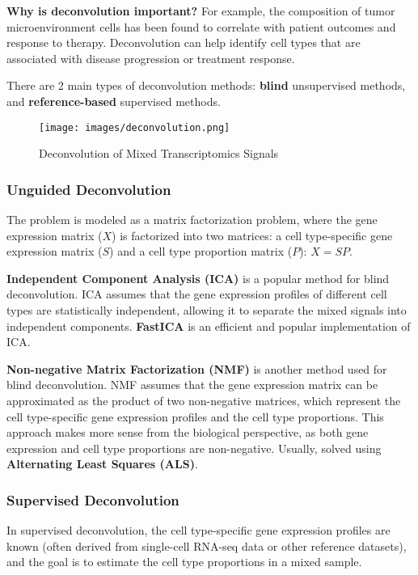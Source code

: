\documentclass[a4paper]{article}
\begin{document}
\textbf{Why is deconvolution important?} For example, the composition 
of tumor microenvironment cells has been found to correlate with patient
outcomes and response to therapy. Deconvolution can help identify cell types
that are associated with disease progression or treatment response.

There are 2 main types of deconvolution methods: \textbf{blind} unsupervised
methods, and \textbf{reference-based} supervised methods. 

\begin{figure}
  \centering
  \texttt{[image: images/deconvolution.png]}
  \caption{Deconvolution of Mixed Transcriptomics Signals}
\end{figure}

\subsubsection*{Unguided Deconvolution}

The problem is modeled as a matrix factorization problem, where the gene expression
matrix ($X$) is factorized into two matrices: a cell type-specific gene expression
matrix ($S$) and a cell type proportion matrix ($P$): $X = SP$.

\textbf{Independent Component Analysis (ICA)} is a popular method for blind
deconvolution. ICA assumes that the gene expression profiles of different cell types
are statistically independent, allowing it to separate the mixed signals into
independent components. \textbf{FastICA} is an efficient and popular
implementation of ICA.

\textbf{Non-negative Matrix Factorization (NMF)} is another method used for
blind deconvolution. NMF assumes that the gene expression matrix can be
approximated as the product of two non-negative matrices, which represent the
cell type-specific gene expression profiles and the cell type proportions.
This approach makes more sense from the biological perspective, as both gene
expression and cell type proportions are non-negative. Usually, solved
using \textbf{Alternating Least Squares (ALS)}.

\subsubsection*{Supervised Deconvolution}

In supervised deconvolution, the cell type-specific gene expression profiles 
are known (often derived from single-cell RNA-seq data or other reference datasets), 
and the goal is to estimate the cell type proportions in a mixed sample.  
\end{document}

